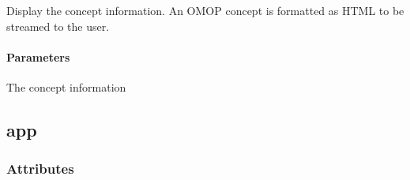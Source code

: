 \documentclass[letterpaper,10pt,english]{sphinxmanual}
\begin{document}

\begin{fulllineitems}
\label{\detokenize{autoapi/ui/index:ui.display_concept_info}}
\pysigstartsignatures
{}
\pysigstopsignatures
\sphinxAtStartPar
Display the concept information.
An OMOP concept is formatted as HTML to be streamed to the user.


\paragraph{Parameters}
\label{\detokenize{autoapi/ui/index:id4}}\begin{description}
\sphinxAtStartPar
The concept information

\end{description}

\end{fulllineitems}


\begin{fulllineitems}
\label{\detokenize{autoapi/ui/index:ui.result_stream}}
\pysigstartsignatures
{}
\pysigstopsignatures
\end{fulllineitems}


\sphinxstepscope


\subsection{app}
\label{\detokenize{autoapi/app/index:module-app}}\label{\detokenize{autoapi/app/index:app}}\label{\detokenize{autoapi/app/index::doc}}

\subsubsection{Attributes}
\label{\detokenize{autoapi/app/index:attributes}}
\end{document}
